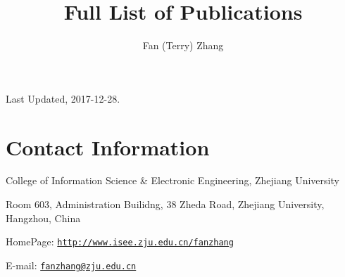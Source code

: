 \documentclass[11pt]{article}
\begin{document}
\title{%
{\sc Full List of Publications}}

\author{Fan (Terry) Zhang}

\date{\vspace{-.2cm}}



\maketitle
Last Updated, 2017-12-28.
\section*{Contact Information}
\hspace{.52cm} College of Information Science \& Electronic Engineering, Zhejiang University

Room 603, Administration Builidng, 38 Zheda Road, Zhejiang University, Hangzhou, China

HomePage: \href{http://www.isee.zju.edu.cn/fanzhang}{\tt http://www.isee.zju.edu.cn/fanzhang}


E-mail: \href{mailto:fanzhang@zju.edu.cn}{\tt fanzhang@zju.edu.cn}

%
%
%
\end{document}
